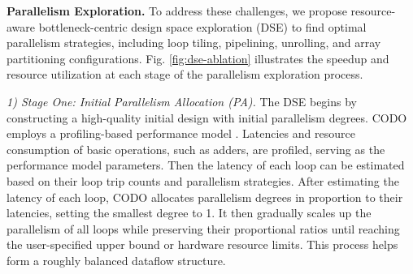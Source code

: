 \documentclass[conference]{IEEEtran}
\begin{document}
\textbf{Parallelism Exploration.}
To address these challenges, we propose resource-aware bottleneck-centric design space exploration (DSE) to find optimal parallelism strategies, including loop tiling, pipelining, unrolling, and array partitioning configurations.
Fig. \ref{fig:dse-ablation} illustrates the  speedup and resource utilization at each stage of the parallelism exploration process.


\textit{1) Stage One: Initial Parallelism Allocation (\textit{PA}).} 
The DSE begins by constructing a high-quality initial design with initial parallelism degrees. 
CODO employs a profiling-based performance model \cite{zhao2017comba} \cite{ye2022scalehls}. Latencies and resource consumption of basic operations, such as adders, are profiled, serving as the performance model parameters. Then the latency of each loop can be estimated based on their loop trip counts and parallelism strategies. 
After estimating the latency of each loop, CODO allocates parallelism degrees in proportion to their latencies, setting the smallest degree to 1. It then gradually scales up the parallelism of all loops while preserving their proportional ratios until reaching the user-specified upper bound or hardware resource limits. This process helps form a roughly balanced dataflow structure.
\end{document}
